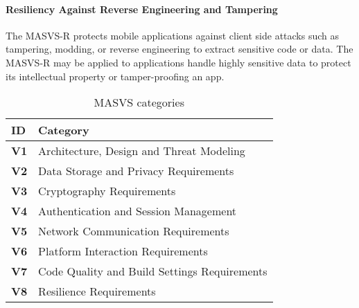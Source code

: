 \paragraph{Resiliency Against Reverse Engineering and Tampering}
The MASVS-R protects mobile applications against client side attacks such as tampering, modding, or reverse engineering to extract sensitive code or data. The MASVS-R may be applied to applications handle highly sensitive data to protect its intellectual property or tamper-proofing an app.

\begin{table}
    \centering
    \caption{MASVS categories}
    \label{tab:masvs-categories}
    \begin{tabulary}{1.0\textwidth}{|L|L|}
        \hline
        \textbf{ID} & \textbf{Category} \\
        \hline
        \textbf{V1} & Architecture, Design and Threat Modeling \\
        \hline
        \textbf{V2} & Data Storage and Privacy Requirements \\
        \hline
        \textbf{V3} & Cryptography Requirements \\
        \hline
        \textbf{V4} & Authentication and Session Management \\
        \hline
        \textbf{V5} & Network Communication Requirements \\
        \hline
        \textbf{V6} & Platform Interaction Requirements \\
        \hline
        \textbf{V7} & Code Quality and Build Settings Requirements \\
        \hline
        \textbf{V8} & Resilience Requirements \\
        \hline
    \end{tabulary}
\end{table}


